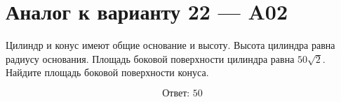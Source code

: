 \documentclass[12pt,a4paper]{article}
\begin{document}
\section*{Аналог к варианту 22 — A02}

Цилиндр и конус имеют общие основание и высоту. Высота цилиндра равна радиусу основания. Площадь боковой поверхности цилиндра равна \(50\sqrt2\). Найдите площадь боковой поверхности конуса.

\begin{center}
\end{center}

\[
\boxed{\text{Ответ: }50}
\]
\end{document}
